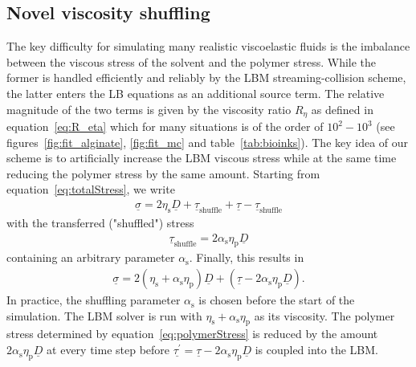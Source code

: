 \documentclass[a4paper,12pt]{scrartcl}
\newcommand{\ma}[1]{\underline{#1}}
\begin{document}
\subsection{Novel viscosity shuffling}\label{sec:shuffling}

The key difficulty for simulating many realistic viscoelastic fluids is the imbalance between the viscous stress of the solvent and the polymer stress.
While the former is handled efficiently and reliably by the LBM streaming-collision scheme, the latter enters the LB equations as an additional source term.
The relative magnitude of the two terms is given by the viscosity ratio $R_\eta$ as defined in equation~\ref{eq:R_eta} which for many situations is of the order of $10^2-10^3$ (see figures~\ref{fig:fit_alginate}, \ref{fig:fit_mc} and table~\ref{tab:bioinks}).
The key idea of our scheme is to artificially increase the LBM viscous stress while at the same time reducing the polymer stress by the same amount.
Starting from equation~\ref{eq:totalStress}, we write
\begin{align}
	\ma{\sigma} = 2\eta_\text{s}\ma{D} + \ma{\tau}_\text{shuffle} + \ma{\tau} - \ma{\tau}_\text{shuffle}	\label{eq:shuffleStress}
\end{align}
with the transferred ("shuffled") stress
\begin{align}
	\ma{\tau}_\text{shuffle} = 2\alpha_\text{s}\eta_\text{p}\ma{D}
\end{align}
containing an arbitrary parameter $\alpha_\text{s}$.
Finally, this results in
\begin{align}
	\ma{\sigma} = 2\left(\eta_\text{s} + \alpha_\text{s}\eta_\text{p}\right)\ma{D} + \left(\ma{\tau} - 2\alpha_\text{s}\eta_\text{p}\ma{D}\right).
\end{align}
In practice, the shuffling parameter $\alpha_\text{s}$ is chosen before the start of the simulation.
The LBM solver is run with $\eta_\text{s} + \alpha_\text{s}\eta_\text{p}$ as its viscosity.
The polymer stress determined by equation~\ref{eq:polymerStress} is reduced by the amount $2\alpha_\text{s}\eta_\text{p}\ma{D}$ at every time step before $\ma{\tau^\prime} = \ma{\tau} - 2\alpha_\text{s}\eta_\text{p}\ma{D}$ is coupled into the LBM.
\end{document}

